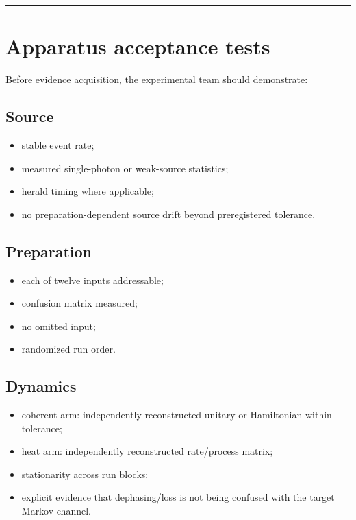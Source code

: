 \documentclass[11pt,a4paper,openany]{report}
\begin{document}
\par\medskip\hrule\medskip

\chapter{Apparatus acceptance tests}

Before evidence acquisition, the experimental team should demonstrate:

\section{Source}

\begin{itemize}
\item 
stable event rate;

\item 
measured single-photon or weak-source statistics;

\item 
herald timing where applicable;

\item 
no preparation-dependent source drift beyond preregistered tolerance.

\end{itemize}

\section{Preparation}

\begin{itemize}
\item 
each of twelve inputs addressable;

\item 
confusion matrix measured;

\item 
no omitted input;

\item 
randomized run order.

\end{itemize}

\section{Dynamics}

\begin{itemize}
\item 
coherent arm: independently reconstructed unitary or Hamiltonian within tolerance;

\item 
heat arm: independently reconstructed rate/\allowbreak{}process matrix;

\item 
stationarity across run blocks;

\item 
explicit evidence that dephasing/\allowbreak{}loss is not being confused with the target Markov channel.

\end{itemize}
\end{document}
